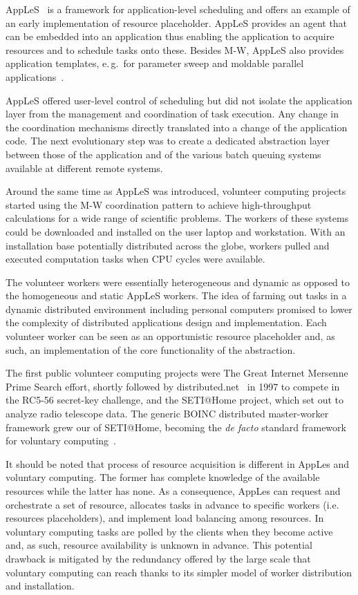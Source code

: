 \documentclass{sig-alternate}
\begin{document}
AppLeS~\cite{Berman:1996:apples} is a framework for application-level
scheduling and offers an example of an early implementation of resource
placeholder. AppLeS provides an agent that can be embedded into an application
thus enabling the application to acquire resources and to schedule tasks onto
these. Besides M-W, AppLeS also provides application templates, e.\,g.\ for
parameter sweep and moldable parallel
applications~\cite{Berman:2003:ACG:766629.766632}.

AppLeS offered user-level control of scheduling but did not isolate the
application layer from the management and coordination of task execution. Any
change in the coordination mechanisms directly translated into a change of the
application code. The next evolutionary step was to create a dedicated
abstraction layer between those of the application and of the various batch
queuing systems available at different remote systems.

Around the same time as AppLeS was introduced, volunteer computing projects
started using the M-W coordination pattern to achieve high-throughput
calculations for a wide range of scientific problems. The workers of these
systems could be downloaded and installed on the user laptop and workstation.
With an installation base potentially distributed across the globe, workers
pulled and executed computation tasks when CPU cycles were available.

The volunteer workers were essentially heterogeneous and dynamic as opposed to
the homogeneous and static AppLeS workers. The idea of farming out tasks in a
dynamic distributed environment including personal computers promised to lower
the complexity of distributed applications design and implementation. Each
volunteer worker can be seen as an opportunistic resource placeholder and, as
such, an implementation of the core functionality of the \pilot abstraction.

The first public volunteer computing projects were The Great Internet Mersenne
Prime Search effort\cite{woltman:2004:gimps}, shortly followed by
distributed.net~\cite{Lawton:2000:distributednet} in 1997 to compete in the
RC5-56 secret-key challenge, and the SETI@Home project, which set out to
analyze radio telescope data. The generic BOINC distributed master-worker
framework grew our of SETI@Home, becoming the {\it de facto} standard framework
for voluntary computing~\cite{Anderson:2004:BSP:1032646.1033223}.

It should be noted that process of resource acquisition is different in AppLes
and voluntary computing. The former has complete knowledge of the available
resources while the latter has none. As a consequence, AppLes can request and
orchestrate a set of resource, allocates tasks in advance to specific workers
(i.e. resources placeholders), and implement load balancing among resources. In
voluntary computing tasks are polled by the clients when they become active
and, as such, resource availability is unknown in advance. This potential
drawback is mitigated by the redundancy offered by the large scale that
voluntary computing can reach thanks to its simpler model of worker
distribution and installation.
\end{document}

